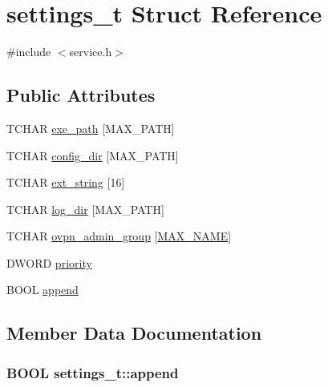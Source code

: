 \hypertarget{structsettings__t}{}\section{settings\+\_\+t Struct Reference}
\label{structsettings__t}


{\ttfamily \#include $<$service.\+h$>$}

\subsection*{Public Attributes}
\begin{DoxyCompactItemize}
\item 
T\+C\+H\+A\+R \hyperlink{structsettings__t_a42376d1376edba6dac152e505b5177db}{exe\+\_\+path} \mbox{[}M\+A\+X\+\_\+\+P\+A\+T\+H\mbox{]}
\item 
T\+C\+H\+A\+R \hyperlink{structsettings__t_a7d3f6a2f9c73a9c41fff9bdff69c5d01}{config\+\_\+dir} \mbox{[}M\+A\+X\+\_\+\+P\+A\+T\+H\mbox{]}
\item 
T\+C\+H\+A\+R \hyperlink{structsettings__t_ab73e9de01c93a6ca31ce2eb79a2cc8ad}{ext\+\_\+string} \mbox{[}16\mbox{]}
\item 
T\+C\+H\+A\+R \hyperlink{structsettings__t_a088b83e62804f0717fcb0d67352b5c71}{log\+\_\+dir} \mbox{[}M\+A\+X\+\_\+\+P\+A\+T\+H\mbox{]}
\item 
T\+C\+H\+A\+R \hyperlink{structsettings__t_a73cbc7e839af82bb046b2e0119873512}{ovpn\+\_\+admin\+\_\+group} \mbox{[}\hyperlink{service_8h_ac7c0207aa5a0e10d378be03b68041350}{M\+A\+X\+\_\+\+N\+A\+M\+E}\mbox{]}
\item 
D\+W\+O\+R\+D \hyperlink{structsettings__t_ab0aa05b71ae5c8d3ed0b123dd1b830f3}{priority}
\item 
B\+O\+O\+L \hyperlink{structsettings__t_a1ec5d7f57adfd0df6150c9aae42fb484}{append}
\end{DoxyCompactItemize}


\subsection{Member Data Documentation}
\hypertarget{structsettings__t_a1ec5d7f57adfd0df6150c9aae42fb484}{}
\subsubsection[{append}]{\setlength{\rightskip}{0pt plus 5cm}B\+O\+O\+L settings\+\_\+t\+::append}\label{structsettings__t_a1ec5d7f57adfd0df6150c9aae42fb484}
\hypertarget{structsettings__t_a7d3f6a2f9c73a9c41fff9bdff69c5d01}{}
